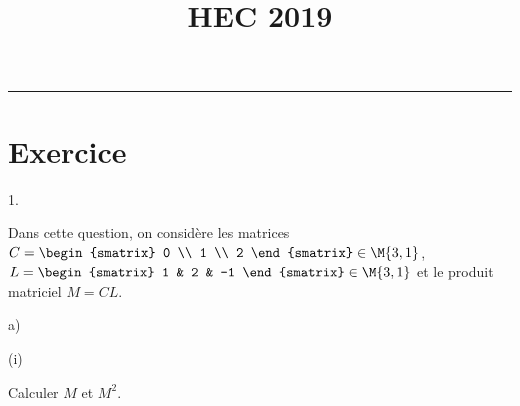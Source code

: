 \documentclass[11pt]{article}%
\title{\bf \vspace{-1.6cm} HEC 2019} %
\author{} %
\date{} %
\begin{document}
\maketitle %
\vspace{-1.2cm}\hrule %
\thispagestyle{fancy}

\vspace*{-.2cm}


\section*{Exercice}

\begin{noliste}{1.}
  \setlength{\itemsep}{4mm} %
\item Dans cette question, on considère les matrices $C =
  \begin{smatrix}
    0 \\
    1 \\
    2
  \end{smatrix}
  \in \M{3, 1}$, $L =
  \begin{smatrix}
    1 & 2 & -1
  \end{smatrix}
  \in \M{3, 1}$ et le produit matriciel $M = CL$.

  \begin{noliste}{a)}
    \setlength{\itemsep}{2mm} %
  \item
    \begin{nonoliste}{(i)}
      \setlength{\itemsep}{2mm} %
    \item Calculer $M$ et $M^2$.


\end{nonoliste}
\end{noliste}
\end{noliste}
\end{document}
